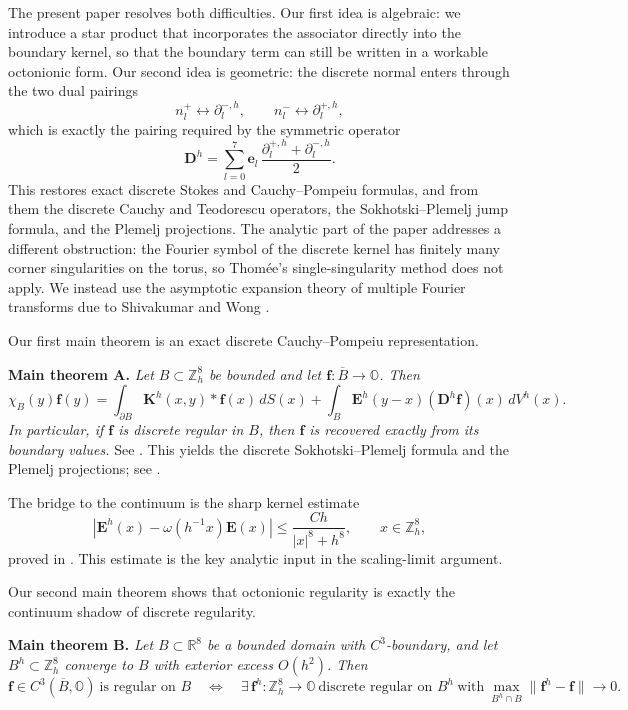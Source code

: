 \documentclass{amsart}
\theoremstyle{definition}
\theoremstyle{remark}
\numberwithin{equation}{section}
\newcommand{\R}{\mathbb{R}}
\newcommand{\OO}{\mathbb O}
\newcommand{\Z}{\mathbb Z}
\newcommand{\f}{\bm{f}}
\newcommand{\e}{\bm{e}}
\newcommand{\E}{\bm{E}}
\begin{document}
The present paper resolves both difficulties. Our first idea is algebraic: we introduce a star product that incorporates the associator directly into the boundary kernel, so that the boundary term can still be written in a workable octonionic form. Our second idea is geometric: the discrete normal enters through the two dual pairings
\[
 n_l^+\leftrightarrow \partial_l^{-,h},
 \qquad
 n_l^-\leftrightarrow \partial_l^{+,h},
\]
which is exactly the pairing required by the symmetric operator
\[
 \bm D^h=\sum_{l=0}^7 \e_l\,\frac{\partial_l^{+,h}+\partial_l^{-,h}}{2}.
\]
This restores exact discrete Stokes and Cauchy--Pompeiu formulas, and from them the discrete Cauchy and Teodorescu operators, the Sokhotski--Plemelj jump formula, and the Plemelj projections. The analytic part of the paper addresses a different obstruction: the Fourier symbol of the discrete kernel has finitely many corner singularities on the torus, so Thom\'ee's single-singularity method \cite{Th} does not apply. We instead use the asymptotic expansion theory of multiple Fourier transforms due to Shivakumar and Wong \cite{SW1979,Wo}.

Our first main theorem is an exact discrete Cauchy--Pompeiu representation.

\medskip\noindent\textbf{Main theorem A.}
\emph{Let $B\subset \Z_h^8$ be bounded and let $\f:\overline B\to\OO$. Then}
\[
\chi_B(y)\f(y)
=\int_{\partial B}\bm K^h(x,y)*\f(x)\,dS(x)
+\int_B \E^h(y-x)(\bm D^h\f)(x)\,dV^h(x).
\]
\emph{In particular, if $\f$ is discrete regular in $B$, then $\f$ is recovered exactly from its boundary values.} See . This yields the discrete Sokhotski--Plemelj formula and the Plemelj projections; see .

The bridge to the continuum is the sharp kernel estimate
\[
|\E^h(x)-\omega(h^{-1}x)\E(x)|\le \frac{Ch}{|x|^8+h^8},
\qquad x\in \Z_h^8,
\]
proved in . This estimate is the key analytic input in the scaling-limit argument.

Our second main theorem shows that octonionic regularity is exactly the continuum shadow of discrete regularity.

\medskip\noindent\textbf{Main theorem B.}
\emph{Let $B\subset\R^8$ be a bounded domain with $C^3$-boundary, and let $B^h\subset\Z_h^8$ converge to $B$ with exterior excess $O(h^2)$. Then}
    $$\f\in C^3(\overline B,\OO)\ \text{is regular on }B
\quad\Longleftrightarrow\quad\exists\,\f^h:\Z_h^8\to\OO\ \text{discrete regular on }B^h
\ \text{with}\ 
\max_{B^h\cap B}\|\f^h-\f\|\to 0.$$
\end{document}
